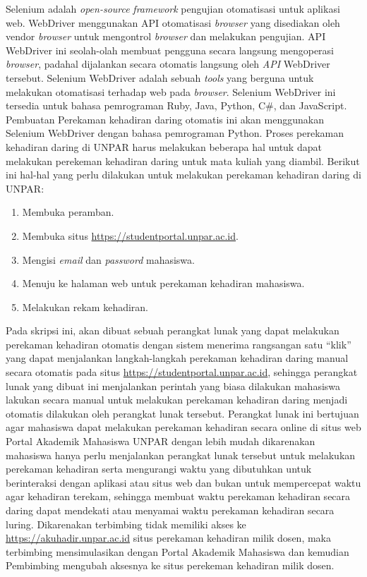 Selenium adalah \textit{open-source} \textit{framework} pengujian otomatisasi untuk aplikasi web\cite{selenium}. WebDriver menggunakan API otomatisasi \textit{browser} yang disediakan oleh vendor \textit{browser} untuk mengontrol \textit{browser} dan melakukan pengujian. API WebDriver ini seolah-olah membuat pengguna secara langsung mengoperasi \textit{browser}, padahal dijalankan secara otomatis langsung oleh \textit{API} WebDriver tersebut. Selenium WebDriver adalah sebuah \textit{tools} yang berguna untuk melakukan otomatisasi terhadap web pada \textit{browser}. Selenium WebDriver ini tersedia untuk bahasa pemrograman Ruby, Java, Python, C\#, dan JavaScript. Pembuatan Perekaman kehadiran daring otomatis ini akan menggunakan Selenium WebDriver dengan bahasa pemrograman Python.  
\newpage
Proses perekaman kehadiran daring di UNPAR harus melakukan beberapa hal untuk dapat melakukan perekeman kehadiran daring untuk mata kuliah yang diambil. Berikut ini hal-hal yang perlu dilakukan untuk melakukan perekaman kehadiran daring di UNPAR:
\begin{enumerate}
	\item Membuka peramban.
	\item Membuka situs \url{https://studentportal.unpar.ac.id}.
	\item Mengisi \textit{email} dan \textit{password} mahasiswa.
	\item Menuju ke halaman web untuk perekaman kehadiran mahasiswa.
	\item Melakukan rekam kehadiran.
\end{enumerate}
Pada skripsi ini, akan dibuat sebuah perangkat lunak yang dapat melakukan perekaman kehadiran otomatis dengan sistem menerima rangsangan satu ``klik'' yang dapat menjalankan langkah-langkah perekaman kehadiran daring manual secara otomatis pada situs \url{https://studentportal.unpar.ac.id}, sehingga perangkat lunak yang dibuat ini menjalankan perintah yang biasa dilakukan mahasiswa lakukan secara manual untuk melakukan perekaman kehadiran daring menjadi otomatis dilakukan oleh perangkat lunak tersebut.
Perangkat lunak ini bertujuan agar mahasiswa dapat melakukan perekaman kehadiran secara online di situs web Portal Akademik Mahasiswa UNPAR dengan lebih mudah dikarenakan mahasiswa hanya perlu menjalankan perangkat lunak tersebut untuk melakukan perekaman kehadiran serta mengurangi waktu yang dibutuhkan untuk berinteraksi dengan aplikasi atau situs web dan bukan untuk mempercepat waktu agar kehadiran terekam, sehingga membuat waktu perekaman kehadiran secara daring dapat mendekati atau menyamai waktu perekaman kehadiran secara luring. Dikarenakan terbimbing tidak memiliki akses ke \url{https://akuhadir.unpar.ac.id} situs perekaman kehadiran milik dosen, maka terbimbing mensimulasikan dengan Portal Akademik Mahasiswa dan kemudian Pembimbing mengubah aksesnya ke situs perekeman kehadiran milik dosen.


